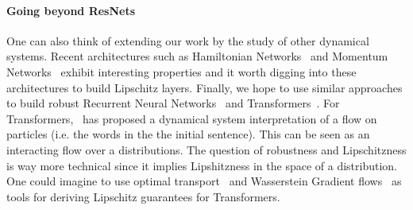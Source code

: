 \paragraph{Going beyond ResNets} One can also think of extending  our work by the study of  other dynamical systems. Recent architectures such as Hamiltonian Networks~\citep{greydanus2019hamiltonian} and Momentum Networks~\citep{sander2021momentum} exhibit interesting properties and it worth digging into these architectures to build Lipschitz layers.
Finally, we hope to use similar approaches to build robust Recurrent Neural Networks~\citep{sherstinsky2020fundamentals} and Transformers~\citep{vaswani2017attention}. For Transformers,~\citet{vuckovic2020mathematical,sander2021sinkformers} has proposed a dynamical system interpretation of a flow on particles (i.e. the words in the the initial sentence). This can be seen as an interacting flow over a distributions. The question of robustness and Lipschitzness is way more technical since it implies Lipshitzness in the space of a distribution. One could imagine to use optimal transport~\citep{villani2003topics} and Wasserstein Gradient flows~\citep{ambrosio2005gradient} as tools for deriving Lipschitz guarantees for Transformers.


